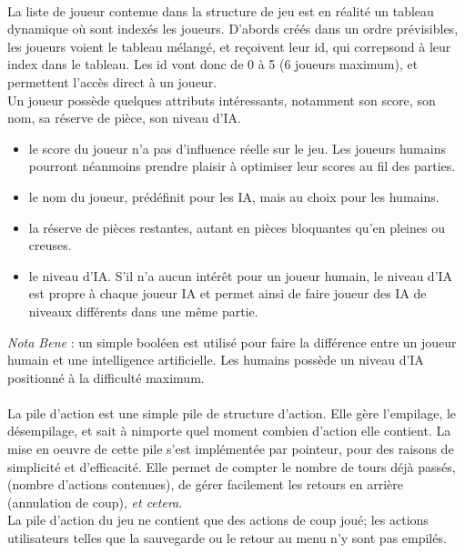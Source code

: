 \documentclass{report}
\begin{document}
        \paragraph*{} %
        La liste de joueur contenue dans la structure de jeu est en réalité un tableau dynamique où sont indexés les joueurs. D'abords créés dans un ordre prévisibles, les joueurs voient
        le tableau mélangé, et reçoivent leur id, qui correpsond à leur index dans le tableau. Les id vont donc de 0 à 5 (6 joueurs maximum), et permettent l'accès direct à un joueur.\\
        Un joueur possède quelques attributs intéressants, notamment son score, son nom, sa réserve de pièce, son niveau d'IA.
        \begin{itemize} %
            \item le score du joueur n'a pas d'influence réelle sur le jeu. Les joueurs humains pourront néanmoins prendre plaisir à optimiser leur scores au fil des parties.
            \item le nom du joueur, prédéfinit pour les IA, mais au choix pour les humains.
            \item la réserve de pièces restantes, autant en pièces bloquantes qu'en pleines ou creuses. 
            \item le niveau d'IA. S'il n'a aucun intérêt pour un joueur humain, le niveau d'IA est propre à chaque joueur IA et permet ainsi de faire joueur des IA de niveaux différents
                dans une même partie.
        \end{itemize} 
        \textit{Nota Bene} : un simple booléen est utilisé pour faire la différence entre un joueur humain et une intelligence artificielle. Les humains possède un niveau d'IA 
            positionné à la difficulté maximum.

        \paragraph*{} %
        La pile d'action est une simple pile de structure d'action. Elle gère l'empilage, le désempilage, et sait à nimporte quel moment combien d'action elle contient. La mise en oeuvre
        de cette pile s'est implémentée par pointeur, pour des raisons de simplicité et d'efficacité. Elle permet de compter le nombre de tours déjà passés, (nombre d'actions contenues),
        de gérer facilement les retours en arrière (annulation de coup), \textit{et cetera}. \\
        La pile d'action du jeu ne contient que des actions de coup joué; les actions utilisateurs telles que la sauvegarde ou le retour au menu n'y sont pas empilés.
\end{document}
